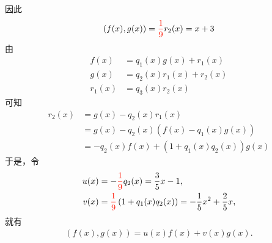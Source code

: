 \documentclass[13pt,fontset=mac]{ctexbeamer}
\newcommand{\red}{\textcolor{red}}
\begin{document}
\begin{frame}
因此
    $$(f(x), g(x))=\red{\frac{1}{9}}r_2(x)= x+3$$
由\begin{align*}
        {f(x)} & =q_1(x) {g(x)} +r_1(x)\\
        {g(x)} & =q_2(x) {r_1(x)} +r_2(x)\\
        {r_1(x)} & = q_3(x) {r_2(x)}
    \end{align*}
可知
\begin{align*}
r_2(x)  & ={g(x)} - q_2(x) {r_1(x)} \\
 & ={g(x)} - q_2(x) \left(   {f(x)} - q_1(x) {g(x)}  \right)  \\
 & = - q_2(x) {f(x)} + \left(  1+  q_1(x)  q_2(x)   \right)  {g(x)}
\end{align*}
于是，令
\begin{align*}
u(x) & =  - \red{\frac{1}{9}} q_2(x) = \frac{3}{5} x-1,\\
v(x) & =\red{\frac{1}{9}} \left(  1+  q_1(x)  q_2(x)   \right) =  -\frac{1}{5} x^{2}+\frac{2}{5} x,
\end{align*}
就有
\begin{align*}
(f(x), g(x))=u(x) f(x)+v(x) g(x) .
\end{align*}


\end{frame}
\end{document}
